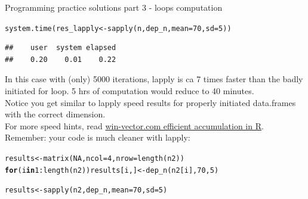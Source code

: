 \documentclass[xcolor=table,           xcolor=dvipsnames]{beamer}\usepackage[]{graphicx}\usepackage[]{color}
\makeatletter
\newcommand{\hlnum}[1]{\textcolor[rgb]{0,0,0}{#1}}
\newcommand{\hlopt}[1]{\textcolor[rgb]{0,0,0}{#1}}
\newcommand{\hlstd}[1]{\textcolor[rgb]{0,0,0}{#1}}
\newcommand{\hlkwa}[1]{\textcolor[rgb]{1,0,0}{\textbf{#1}}}
\newcommand{\hlkwb}[1]{\textcolor[rgb]{0,0,0}{#1}}
\newcommand{\hlkwc}[1]{\textcolor[rgb]{1,0,1}{#1}}
\newcommand{\hlkwd}[1]{\textcolor[rgb]{0,0,1}{#1}}
\newenvironment{kframe}{%
 \def\at@end@of@kframe{}%
 \ifinner\ifhmode%
  \def\at@end@of@kframe{\end{minipage}}%
  \begin{minipage}{\columnwidth}%
 \fi\fi%
 \def\FrameCommand##1{\hskip\@totalleftmargin \hskip-\fboxsep
 \colorbox{shadecolor}{##1}\hskip-\fboxsep
     \hskip-\linewidth \hskip-\@totalleftmargin \hskip\columnwidth}%
 \MakeFramed {\advance\hsize-\width
   \@totalleftmargin\z@ \linewidth\hsize
   \@setminipage}}%
 {\par\unskip\endMakeFramed%
 \at@end@of@kframe}
\newenvironment{knitrout}{}{} %
\makeatother
\begin{document}
\begin{frame}[fragile]{Programming practice solutions part 3 - loops computation}
\begin{knitrout}
\color{fgcolor}\begin{kframe}
\begin{alltt}
\hlkwd{system.time}\hlstd{(res_lapply} \hlkwb{<-} \hlkwd{sapply}\hlstd{(n, dep_n,} \hlkwc{mean}\hlstd{=}\hlnum{70}\hlstd{,}\hlkwc{sd}\hlstd{=}\hlnum{5}\hlstd{)  )}
\end{alltt}
\begin{verbatim}
##    user  system elapsed 
##    0.20    0.01    0.22
\end{verbatim}
\end{kframe}
\end{knitrout}
In this case with (only) 5000 iterations, lapply is ca 7 times faster than the badly initiated for loop. 5 hrs of computation would reduce to 40 minutes.\\
Notice you get similar to lapply speed  results for properly initiated data.frames with the correct dimension.\\
For more speed hints, read \href{http://www.win-vector.com/blog/2015/07/efficient-accumulation-in-r/}{win-vector.com efficient accumulation in R}.\\
Remember: your code is much cleaner with lapply:\\
\begin{knitrout}
\color{fgcolor}\begin{kframe}
\begin{alltt}
\hlstd{results} \hlkwb{<-} \hlkwd{matrix}\hlstd{(}\hlnum{NA}\hlstd{,} \hlkwc{ncol}\hlstd{=}\hlnum{4}\hlstd{,} \hlkwc{nrow}\hlstd{=}\hlkwd{length}\hlstd{(n2))}
\hlkwa{for}\hlstd{(i} \hlkwa{in} \hlnum{1}\hlopt{:}\hlkwd{length}\hlstd{(n2)) results[i, ]} \hlkwb{<-} \hlkwd{dep_n}\hlstd{(n2[i],} \hlnum{70}\hlstd{,}\hlnum{5}\hlstd{)}

\hlstd{results} \hlkwb{<-} \hlkwd{sapply}\hlstd{(n2, dep_n,} \hlkwc{mean}\hlstd{=}\hlnum{70}\hlstd{,}\hlkwc{sd}\hlstd{=}\hlnum{5}\hlstd{)}
\end{alltt}
\end{kframe}
\end{knitrout}
\end{frame}

\end{document}
